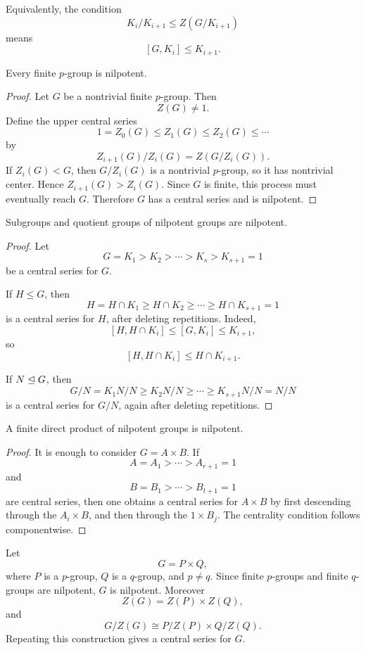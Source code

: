 Equivalently, the condition
\[
    K_i/K_{i+1}\leq Z(G/K_{i+1})
\]
means
\[
    [G,K_i]\leq K_{i+1}.
\]

\begin{proposition}
Every finite \(p\)-group is nilpotent.
\end{proposition}

\begin{proof}
Let \(G\) be a nontrivial finite \(p\)-group. Then
\[
    Z(G)\neq 1.
\]
Define the upper central series
\[
    1=Z_0(G)\leq Z_1(G)\leq Z_2(G)\leq \cdots
\]
by
\[
    Z_{i+1}(G)/Z_i(G)=Z(G/Z_i(G)).
\]
If \(Z_i(G)<G\), then \(G/Z_i(G)\) is a nontrivial \(p\)-group, so it has
nontrivial center. Hence \(Z_{i+1}(G)>Z_i(G)\). Since \(G\) is finite, this
process must eventually reach \(G\). Therefore \(G\) has a central series and
is nilpotent.
\end{proof}

\begin{proposition}
Subgroups and quotient groups of nilpotent groups are nilpotent.
\end{proposition}

\begin{proof}
Let
\[
    G=K_1>K_2>\cdots>K_s>K_{s+1}=1
\]
be a central series for \(G\).

If \(H\leq G\), then
\[
    H=H\cap K_1\geq H\cap K_2\geq \cdots \geq H\cap K_{s+1}=1
\]
is a central series for \(H\), after deleting repetitions. Indeed,
\[
    [H,H\cap K_i]\leq [G,K_i]\leq K_{i+1},
\]
so
\[
    [H,H\cap K_i]\leq H\cap K_{i+1}.
\]

If \(N\trianglelefteq G\), then
\[
    G/N=K_1N/N\geq K_2N/N\geq \cdots \geq K_{s+1}N/N=N/N
\]
is a central series for \(G/N\), again after deleting repetitions.
\end{proof}

\begin{proposition}
A finite direct product of nilpotent groups is nilpotent.
\end{proposition}

\begin{proof}
It is enough to consider \(G=A\times B\). If
\[
    A=A_1>\cdots>A_{r+1}=1
\]
and
\[
    B=B_1>\cdots>B_{t+1}=1
\]
are central series, then one obtains a central series for \(A\times B\) by
first descending through the \(A_i\times B\), and then through the
\(1\times B_j\). The centrality condition follows componentwise.
\end{proof}

\begin{example}
Let
\[
    G=P\times Q,
\]
where \(P\) is a \(p\)-group, \(Q\) is a \(q\)-group, and \(p\neq q\). Since
finite \(p\)-groups and finite \(q\)-groups are nilpotent, \(G\) is nilpotent.
Moreover
\[
    Z(G)=Z(P)\times Z(Q),
\]
and
\[
    G/Z(G)\cong P/Z(P)\times Q/Z(Q).
\]
Repeating this construction gives a central series for \(G\).
\end{example}

